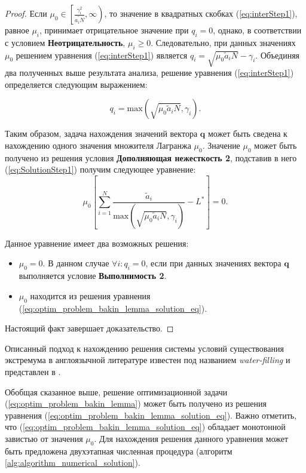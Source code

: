 \begin{proof}
Если $\mu_0 \in \left[\frac{\gamma_i^2}{\tilde{a_i N}},\infty\right)$, то значение в квадратных скобках (\ref{eq:interStep1}), равное $\mu_i$, принимает отрицательное значение при $q_i = 0$, однако, в соответствии с условием \textbf{Неотрицательность}, $\mu_i \geq 0$. Следовательно, при данных значениях $\mu_0$ решением уравнения (\ref{eq:interStep1}) является $q_i = \sqrt{\mu_0 \tilde{a}_i N}-\gamma_i$. Объединяя два полученных выше результата анализа, решение уравнения (\ref{eq:interStep1}) определяется следующим выражением:

\begin{equation}
q_i  = \mathrm{max} \left(\sqrt{\mu_0 \tilde{a}_i N}, \gamma_i \right).
\label{eq:SolutionStep1}
\end{equation}

Таким образом, задача нахождения значений вектора $\boldsymbol{q}$ может быть сведена к нахождению одного значения множителя Лагранжа $\mu_0$. Значение $\mu_0$ может быть получено из решения условия \textbf{Дополняющая нежесткость 2}, подставив в него (\ref{eq:SolutionStep1}) получим следующее уравнение:
$$\mu_0 \left[\sum\limits_{i=1}^{N} {\frac{\tilde{a}_i}{\mathrm{max} \left(\sqrt{\mu_0 \tilde{a}_i N}, \gamma_i\right)}} - L^{*}\right] = 0.$$

Данное уравнение имеет два возможных решения:
\begin{itemize}
	\item $\mu_0 = 0$. В данном случае $\forall i: q_i = 0$, если при данных значениях вектора $\boldsymbol{q}$ выполняется условие \textbf{Выполнимость 2}.
	\item $\mu_0$ находится из решения уравнения (\ref{eq:optim_problem_bakin_lemma_solution_eq}).
\end{itemize}
Настоящий факт завершает доказательство.
\end{proof}

Описанный подход к нахождению решения системы условий существования экстремума в англоязычной литературе известен под названием \textit{water-filling} и представлен в \cite{convex_opt}.

Обобщая сказанное выше, решение оптимизационной задачи (\ref{eq:optim_problem_bakin_lemma}) может быть получено из решения уравнения (\ref{eq:optim_problem_bakin_lemma_solution_eq}). Важно отметить, что (\ref{eq:optim_problem_bakin_lemma_solution_eq}) обладает монотонной завистью от значения $\mu_0$. Для нахождения решения данного уравнения может быть предложена двухэтапная численная процедура (алгоритм \ref{alg:algorithm_numerical_solution}).

